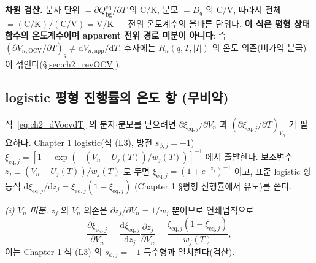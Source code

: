 \documentclass[11pt,a4paper]{article}
\newcommand{\dd}{\mathrm{d}}
\newcommand{\eq}{\mathrm{eq}}
\newcommand{\app}{\mathrm{app}}
\newcommand{\bg}{\mathrm{bg}}
\newcommand{\OCV}{\mathrm{OCV}}
\begin{document}
\textbf{차원 검산.} 분자 단위 $=\partial Q_\bg^{\eq}/\partial T$ 의 $\mathrm{C/K}$, 분모 $=D_q$ 의 $\mathrm{C/V}$,
따라서 전체 $=(\mathrm{C/K})/(\mathrm{C/V})=\mathrm{V/K}$ — 전위 온도계수의 올바른 단위다. \textbf{이 식은 평형
상태함수의 온도계수이며 apparent 전위 경로 미분이 아니다}: 즉 $(\partial V_{n,\OCV}/\partial T)_q\ne
\dd V_{n,\app}/\dd T$. 후자에는 $R_n(q,T,|I|)$ 의 온도 의존(비가역 분극)이 섞인다(\S\ref{sec:ch2_revOCV}).

\subsection{logistic 평형 진행률의 온도 항 (무비약)}\label{sec:ch2_ocvT_logistic}
식~\eqref{eq:ch2_dVocvdT} 의 분자$\cdot$분모를 닫으려면 $\partial\xi_{\eq,j}/\partial V_n$ 과
$(\partial\xi_{\eq,j}/\partial T)_{V_n}$ 가 필요하다. Chapter 1 logistic(식 (L3), 방전 $s_{\phi,j}=+1$)
$\xi_{\eq,j}=[1+\exp(-(V_n-U_j(T))/w_j(T))]^{-1}$ 에서 출발한다. 보조변수 $z_j\equiv(V_n-U_j(T))/w_j(T)$ 로 두면
$\xi_{\eq,j}=(1+e^{-z_j})^{-1}$ 이고, 표준 logistic 항등식 $\dd\xi_{\eq,j}/\dd z_j=\xi_{\eq,j}(1-\xi_{\eq,j})$
(Chapter 1 \S 평형 진행률에서 유도)를 쓴다.

\emph{(i) $V_n$ 미분.} $z_j$ 의 $V_n$ 의존은 $\partial z_j/\partial V_n=1/w_j$ 뿐이므로 연쇄법칙으로
\begin{equation}
\frac{\partial\xi_{\eq,j}}{\partial V_n}=\frac{\dd\xi_{\eq,j}}{\dd z_j}\frac{\partial z_j}{\partial V_n}
=\frac{\xi_{\eq,j}(1-\xi_{\eq,j})}{w_j(T)},
\label{eq:ch2_dxidV}
\end{equation}
이는 Chapter 1 식 (L3) 의 $s_{\phi,j}=+1$ 특수형과 일치한다(검산).
\end{document}
